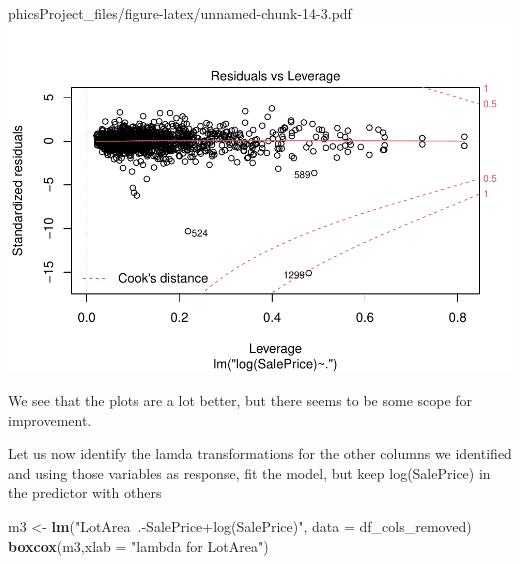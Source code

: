 \documentclass[
]{article}
\newenvironment{Shaded}{\begin{snugshade}}{\end{snugshade}}
\newcommand{\DataTypeTok}[1]{\textcolor[rgb]{0.13,0.29,0.53}{#1}}
\newcommand{\KeywordTok}[1]{\textcolor[rgb]{0.13,0.29,0.53}{\textbf{#1}}}
\newcommand{\NormalTok}[1]{#1}
\newcommand{\StringTok}[1]{\textcolor[rgb]{0.31,0.60,0.02}{#1}}
\begin{document}
phics{Project_files/figure-latex/unnamed-chunk-14-3.pdf} \includegraphics{Project_files/figure-latex/unnamed-chunk-14-4.pdf}

We see that the plots are a lot better, but there seems to be some scope for improvement.

Let us now identify the lamda transformations for the other columns we identified and using those variables as response, fit the model, but keep log(SalePrice) in the predictor with others

\begin{Shaded}
\begin{Highlighting}[]
\NormalTok{m3 <-}\StringTok{ }\KeywordTok{lm}\NormalTok{(}\StringTok{"LotArea~.-SalePrice+log(SalePrice)"}\NormalTok{, }\DataTypeTok{data =}\NormalTok{ df_cols_removed)}
\KeywordTok{boxcox}\NormalTok{(m3,}\DataTypeTok{xlab =} \StringTok{"lambda for LotArea"}\NormalTok{)}
\end{Highlighting}
\end{Shaded}
\end{document}
